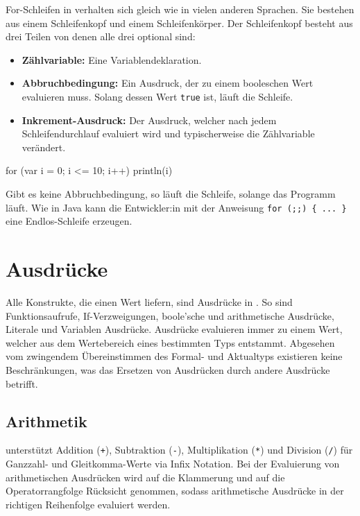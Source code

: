 For-Schleifen in \toya verhalten sich gleich wie in vielen anderen Sprachen. Sie bestehen aus einem Schleifenkopf und einem Schleifenkörper. Der Schleifenkopf besteht aus drei Teilen von denen alle drei optional sind:
\begin{itemize}
    \item \textbf{Zählvariable:} Eine Variablendeklaration.
    \item \textbf{Abbruchbedingung:} Ein Ausdruck, der zu einem booleschen Wert evaluieren muss. Solang dessen Wert \texttt{true} ist, läuft die Schleife.  
    \item \textbf{Inkrement-Ausdruck:} Der Ausdruck, welcher nach jedem Schleifendurchlauf evaluiert wird und typischerweise die Zählvariable verändert.
\end{itemize}

\begin{ToyaCode}[numbers=none, caption={Eine For-Schleife, die die Zählvariable auf die Konsole ausgibt.}]
for (var i = 0; i <= 10; i++) {
    println(i)
}
\end{ToyaCode}

Gibt es keine Abbruchbedingung, so läuft die Schleife, solange das Programm läuft. Wie in Java kann die Entwickler:in mit der Anweisung \texttt{for (;;) \{ ... \}} eine Endlos-Schleife erzeugen.

\section{Ausdrücke}

Alle Konstrukte, die einen Wert liefern, sind Ausdrücke in \toya. So sind Funktionsaufrufe, If-Verzweigungen, boole'sche und arithmetische Ausdrücke, Literale und Variablen Ausdrücke. Ausdrücke evaluieren immer zu einem Wert, welcher aus dem Wertebereich eines bestimmten Typs entstammt. Abgesehen vom zwingendem Übereinstimmen des Formal- und Aktualtyps existieren keine Beschränkungen, was das Ersetzen von Ausdrücken durch andere Ausdrücke betrifft.

\subsection{Arithmetik}

\Toya unterstützt Addition (\texttt{+}), Subtraktion (\texttt{-}), Multiplikation (\texttt{*}) und Division (\texttt{/}) für Ganzzahl- und Gleitkomma-Werte via Infix Notation. Bei der Evaluierung von arithmetischen Ausdrücken wird auf die Klammerung und auf die Operatorrangfolge Rücksicht genommen, sodass arithmetische Ausdrücke in der richtigen Reihenfolge evaluiert werden. 

